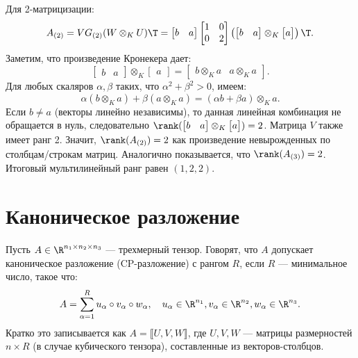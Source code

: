 \begin{tcbproof}
    Для 2-матрицизации:
    \[
        A_{(2)} = V G_{(2)} (W \otimes_K U)\T = \begin{bmatrix} b & a \end{bmatrix} \begin{bmatrix} 1 & 0 \\ 0 & 2 \end{bmatrix} \left( \begin{bmatrix} b & a \end{bmatrix} \otimes_K \begin{bmatrix} a \end{bmatrix} \right)\T.
    \]
    Заметим, что произведение Кронекера дает:
    \[
        \begin{bmatrix} b & a \end{bmatrix} \otimes_K \begin{bmatrix} a \end{bmatrix} = \begin{bmatrix} b \otimes_K a & a \otimes_K a \end{bmatrix}.
    \]
    Для любых скаляров $\alpha, \beta$ таких, что $\alpha^2 + \beta^2 > 0$, имеем:
    \[
        \alpha (b \otimes_K a) + \beta (a \otimes_K a) = (\alpha b + \beta a) \otimes_K a.
    \]
    Если $b \neq a$ (векторы линейно независимы), то данная линейная комбинация не обращается в нуль, следовательно $\rank(\begin{bmatrix} b & a \end{bmatrix} \otimes_K \begin{bmatrix} a \end{bmatrix}) = 2$. Матрица $V$ также имеет ранг 2. Значит, $\rank(A_{(2)}) = 2$ как произведение невырожденных по столбцам/строкам матриц.
    Аналогично показывается, что $\rank(A_{(3)}) = 2$. Итоговый мультилинейный ранг равен $(1, 2, 2)$.
\end{tcbproof}

\section{Каноническое разложение}
\label{sec:canonical-decomposition}

\begin{tcbdefinition}
\label{def:canonical}
    Пусть $A \in \R^{n_1 \times n_2 \times n_3}$ — трехмерный тензор. Говорят, что $A$ допускает каноническое разложение (CP-разложение) с рангом $R$, если $R$ — минимальное число, такое что:
    \[
        A = \sum_{\alpha=1}^R u_\alpha \circ v_\alpha \circ w_\alpha, \quad u_\alpha \in \R^{n_1}, v_\alpha \in \R^{n_2}, w_\alpha \in \R^{n_3}.
    \]
    Кратко это записывается как $A = \llbracket U, V, W \rrbracket$, где $U, V, W$ — матрицы размерностей $n \times R$ (в случае кубического тензора), составленные из векторов-столбцов.
\end{tcbdefinition}

